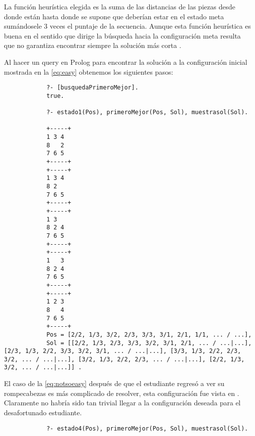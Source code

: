 \begin{enumerate}
\begin{solution}
        La función heurística  elegida es la suma de las distancias de las piezas desde donde están hasta donde se supone que deberían estar en el estado meta sumándosele 3 veces el puntaje de la secuencia. Aunque esta función heurística es buena en el sentido que dirige la búsqueda hacia la configuración meta resulta que no garantiza encontrar siempre la solución más corta \cite{bratko2012prolog}.

        Al hacer un query en Prolog para encontrar la solución a la configuración inicial mostrada en la \cref{eq:easy} obtenemos los siguientes pasos:
        \begin{verbatim}
            ?- [busquedaPrimeroMejor].
            true.

            ?- estado1(Pos), primeroMejor(Pos, Sol), muestrasol(Sol).

            +-----+
            1 3 4
            8   2
            7 6 5
            +-----+
            +-----+
            1 3 4
            8 2  
            7 6 5
            +-----+
            +-----+
            1 3  
            8 2 4
            7 6 5
            +-----+
            +-----+
            1   3
            8 2 4
            7 6 5
            +-----+
            +-----+
            1 2 3
            8   4
            7 6 5
            +-----+
            Pos = [2/2, 1/3, 3/2, 2/3, 3/3, 3/1, 2/1, 1/1, ... / ...],
            Sol = [[2/2, 1/3, 2/3, 3/3, 3/2, 3/1, 2/1, ... / ...|...], [2/3, 1/3, 2/2, 3/3, 3/2, 3/1, ... / ...|...], [3/3, 1/3, 2/2, 2/3, 3/2, ... / ...|...], [3/2, 1/3, 2/2, 2/3, ... / ...|...], [2/2, 1/3, 3/2, ... / ...|...]] .
        \end{verbatim}

        El caso de la \cref{eq:notsoeasy} después de que el estudiante regresó a ver su rompecabezas es más complicado de resolver, esta configuración fue vista en \cite{richardpuzzle}. Claramente no habría sido tan trivial llegar a la configuración deseada para el desafortunado estudiante.
        \begin{verbatim}
            ?- estado4(Pos), primeroMejor(Pos, Sol), muestrasol(Sol).


\end{verbatim}
\end{solution}
\end{enumerate}
